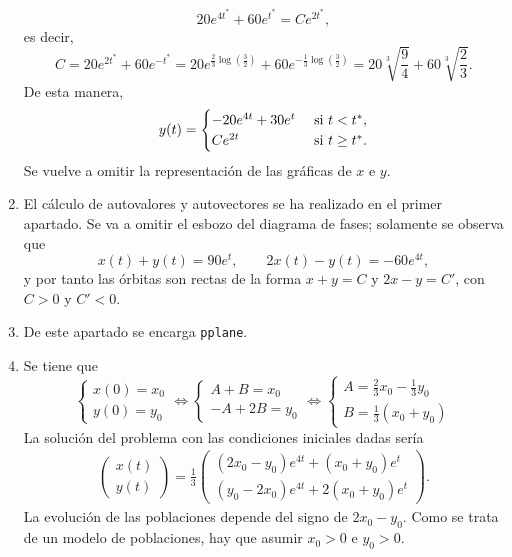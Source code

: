 \documentclass[11pt]{report}
\begin{document}
\begin{solution}
\begin{enumerate}
        \[20e^{4t^*}+60e^{t^*} = Ce^{2t^*},\]
        es decir,
        \[C = 20e^{2t^*}+60e^{-t^*} = 20e^{\frac{2}{3}\log(\frac{3}{2})} + 60e^{-\frac{1}{3}\log(\frac{3}{2})} = 20\sqrt[3]{\frac{9}{4}}+60\sqrt[3]{\frac{2}{3}}.\]
        De esta manera,
        \[y(t) = \begin{cases}
            -20e^{4t}+30e^t & $ si $ t < t^*, \\
            Ce^{2t} & $ si $ t \geq t^*.
        \end{cases}\]
        Se vuelve a omitir la representación de las gráficas de $x$ e $y$.
        \item El cálculo de autovalores y autovectores se ha realizado en el primer apartado. Se va a omitir el esbozo del diagrama de fases; solamente se observa que
        \[x(t)+y(t) = 90e^t, \qquad 2x(t)-y(t) = -60e^{4t},\]
        y por tanto las órbitas son rectas de la forma $x+y = C$ y $2x-y = C'$, con $C > 0$ y $C'<0$.
        \item De este apartado se encarga \texttt{pplane}.
        \item Se tiene que
        \[\begin{cases}
            x(0) = x_0 \\
            y(0) = y_0
        \end{cases} \iff \begin{cases}
            A+B = x_0 \\
            -A+2B = y_0
        \end{cases} \iff \begin{cases}
            A = \frac{2}{3}x_0-\frac{1}{3}y_0 \\
            B =\frac{1}{3}(x_0+y_0)
        \end{cases}\]
        La solución del problema con las condiciones iniciales dadas sería
        \begin{align*}
        \left(\begin{array}{c}
            x(t) \\
            y(t)
        \end{array}\right) = \frac{1}{3}\left(\begin{array}{cc}
            (2x_0-y_0)e^{4t}+(x_0+y_0)e^t \\
            (y_0-2x_0)e^{4t}+2(x_0+y_0)e^t
        \end{array}\right).
        \end{align*}
        La evolución de las poblaciones depende del signo de $2x_0-y_0$. Como se trata de un modelo de poblaciones, hay que asumir $x_0 > 0$ e $y_0 > 0$.

\end{enumerate}
\end{solution}
\end{document}
